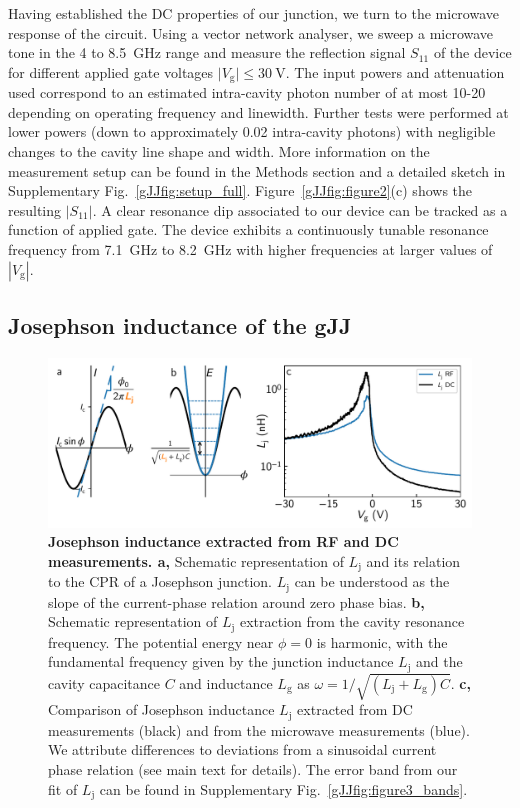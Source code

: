 Having established the DC properties of our junction, we turn to the microwave response of the circuit.
Using a vector network analyser, we sweep a microwave tone in the 4 to \SI{8.5}{\giga\hertz} range and measure the reflection signal $S_{11}$ of the device for different applied gate voltages $\lvert V_\text{g} \rvert \leq \SI{30}{\volt}$.
The input powers and attenuation used correspond to an estimated intra-cavity photon number of at most 10-20 depending on operating frequency and linewidth.
Further tests were performed at lower powers (down to approximately 0.02 intra-cavity photons) with negligible changes to the cavity line shape and width.
More information on the measurement setup can be found in the Methods section and a detailed sketch in Supplementary Fig.~\ref{gJJfig:setup_full}.
Figure~\ref{gJJfig:figure2}(c) shows the resulting $\lvert S_{11}\rvert$.
A clear resonance dip associated to our device can be tracked as a function of applied gate.
The device exhibits a continuously tunable resonance frequency from \SI{7.1}{\giga\hertz} to \SI{8.2}{\giga\hertz} with higher frequencies at larger values of $|V_\text{g}|$.

\subsection{Josephson inductance of the gJJ}

\begin{figure}[thb]
	\centering
	\includegraphics[width=\linewidth]{chapter-gJJ/figs/fig3_final}
	\caption[]{\textbf{Josephson inductance extracted from RF and DC measurements. a,}
		Schematic representation of $L_\text{j}$ and its relation to the CPR of a Josephson junction.
		$L_\text{j}$ can be understood as the slope of the current-phase relation around zero phase bias.
		\textbf{b,} Schematic representation of $L_\text{j}$ extraction from the cavity resonance frequency.
		The potential energy near $\phi = 0$ is harmonic, with the fundamental frequency given by the junction inductance $L_\text{j}$ and the cavity capacitance $C$ and inductance $L_\text{g}$ as $\omega = 1/\sqrt{(L_\text{j}+L_\text{g})C}$.
		\textbf{c,} Comparison of Josephson inductance $L_\text{j}$ extracted from DC measurements (black) and from the microwave measurements (blue).
		We attribute differences to deviations from a sinusoidal current phase relation (see main text for details).
		The error band from our fit of $L_\text{j}$ can be found in Supplementary Fig.~\ref{gJJfig:figure3_bands}.
	}
	\label{gJJfig:figure3}
\end{figure}

